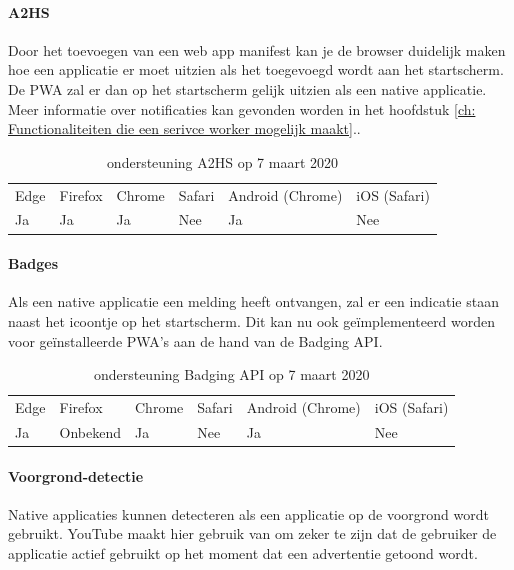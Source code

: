 	
	
	\paragraph{A2HS}
	
	
	 Door het toevoegen van een web app manifest kan je de browser duidelijk maken hoe een applicatie er moet uitzien als het toegevoegd wordt aan het startscherm. De PWA zal er dan op het startscherm gelijk uitzien als een native applicatie.
		Meer informatie over notificaties kan gevonden worden in het hoofdstuk \ref{ch: Functionaliteiten die een serivce worker mogelijk maakt}..
	
	
	\begin{table}[H]
		\centering
		\begin{tabular}{llllll}
			Edge & Firefox & Chrome & Safari & Android (Chrome) & iOS (Safari) \\
			Ja   & Ja      &  Ja     & Nee     & Ja               & Nee          
		\end{tabular}	
		\caption{ondersteuning A2HS op 7 maart 2020 }
	\end{table}
	
	
	\paragraph{Badges}
	
	Als een native applicatie een melding heeft ontvangen, zal er een indicatie staan naast het icoontje op het startscherm. Dit kan nu ook geïmplementeerd worden voor geïnstalleerde PWA's aan de hand van de Badging API. \autocite{LePage2020a}
	
	\begin{table}[H]
		\centering
		\begin{tabular}{llllll}
			Edge & Firefox & Chrome & Safari & Android (Chrome) & iOS (Safari) \\
			Ja   & Onbekend      &  Ja     & Nee     & Ja               & Nee          
		\end{tabular}	
		\caption{ondersteuning Badging API op 7 maart 2020}
	\end{table}
	
	\paragraph{Voorgrond-detectie }
	
	Native applicaties kunnen detecteren als een applicatie op de voorgrond wordt gebruikt. YouTube maakt hier gebruik van om zeker te zijn dat de gebruiker de applicatie actief gebruikt op het moment dat een advertentie getoond wordt.
	
